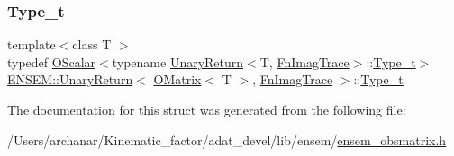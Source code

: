 \subsubsection{\texorpdfstring{Type\_t}{Type\_t}\hspace{0.1cm}{\footnotesize\ttfamily [2/2]}}
{\footnotesize\ttfamily template$<$class T $>$ \\
typedef \mbox{\hyperlink{classENSEM_1_1OScalar}{O\+Scalar}}$<$typename \mbox{\hyperlink{structENSEM_1_1UnaryReturn}{Unary\+Return}}$<$T, \mbox{\hyperlink{structENSEM_1_1FnImagTrace}{Fn\+Imag\+Trace}}$>$\+::\mbox{\hyperlink{structENSEM_1_1UnaryReturn_3_01OMatrix_3_01T_01_4_00_01FnImagTrace_01_4_a7b4a608d50b5637e2ca0d51ba6ff692b}{Type\+\_\+t}}$>$ \mbox{\hyperlink{structENSEM_1_1UnaryReturn}{E\+N\+S\+E\+M\+::\+Unary\+Return}}$<$ \mbox{\hyperlink{classENSEM_1_1OMatrix}{O\+Matrix}}$<$ T $>$, \mbox{\hyperlink{structENSEM_1_1FnImagTrace}{Fn\+Imag\+Trace}} $>$\+::\mbox{\hyperlink{structENSEM_1_1UnaryReturn_3_01OMatrix_3_01T_01_4_00_01FnImagTrace_01_4_a7b4a608d50b5637e2ca0d51ba6ff692b}{Type\+\_\+t}}}



The documentation for this struct was generated from the following file\+:\begin{DoxyCompactItemize}
\item 
/\+Users/archanar/\+Kinematic\+\_\+factor/adat\+\_\+devel/lib/ensem/\mbox{\hyperlink{lib_2ensem_2ensem__obsmatrix_8h}{ensem\+\_\+obsmatrix.\+h}}\end{DoxyCompactItemize}
